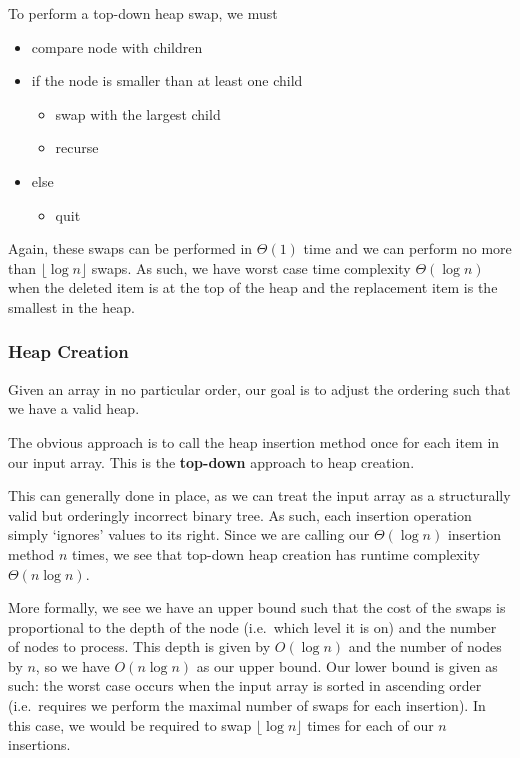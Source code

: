 \documentclass[12pt]{article}
\begin{document}
To perform a top-down heap swap, we must
\begin{itemize}
\item compare node with children
\item if the node is smaller than at least one child
\begin{itemize}
\item swap with the largest child
\item recurse
\end{itemize}
\item else
\begin{itemize}
\item quit
\end{itemize}
\end{itemize}

Again, these swaps can be performed in $\Theta(1)$ time and we can perform no more than $\lfloor\log n\rfloor$ swaps. As such, we have worst case time complexity $\Theta(\log n)$ when the deleted item is at the top of the heap and the replacement item is the smallest in the heap.

\subsubsection{Heap Creation}
Given an array in no particular order, our goal is to adjust the ordering such that we have a valid heap.

The obvious approach is to call the heap insertion method once for each item in our input array. This is the {\bf top-down} approach to heap creation.

This can generally done in place, as we can treat the input array as a structurally valid but orderingly incorrect binary tree. As such, each insertion operation simply `ignores' values to its right. Since we are calling our $\Theta(\log n)$ insertion method $n$ times, we see that top-down heap creation has runtime complexity $\Theta(n\log n)$.

More formally, we see we have an upper bound such that the cost of the swaps is proportional to the depth of the node (i.e.\ which level it is on) and the number of nodes to process. This depth is given by $O(\log n)$ and the number of nodes by $n$, so we have $O(n\log n)$ as our upper bound. Our lower bound is given as such: the worst case occurs when the input array is sorted in ascending order (i.e.\ requires we perform the maximal number of swaps for each insertion). In this case, we would be required to swap $\lfloor\log n\rfloor$ times for each of our $n$ insertions.
\end{document}

